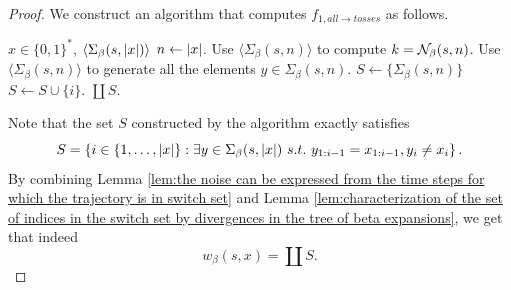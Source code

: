 \begin{proof}
    We construct an algorithm that computes $f_{1,all \to tosses}$ as follows.
    \begin{algorithm}[ht]
        \caption{Algorithm for computing $f_{1,all \to tosses}$}
        \label{alg:algorithm that computes f 1 all noise}
        \begin{algorithmic}[1]
            \Require $x \in \{0,1\}^\ast$, $\langle \Sigma_\beta(s, \left| x \right|) \rangle$
            \State $n \gets \left| x \right|$. \label{line:1:alg:algorithm that computes f 1 all noise}
            \State Use $\langle \Sigma_\beta(s, n) \rangle$ to compute $k = \mathcal{N}_\beta(s,n)$.\label{line:2:alg:algorithm that computes f 1 all noise}
            \State Use $\langle \Sigma_\beta(s, n) \rangle$ to generate all the elements $y \in \Sigma_\beta(s, n)$.\label{line:3:alg:algorithm that computes f 1 all noise}
            \State $S \gets \{\Sigma_\beta(s, n)\}$\label{line:4:alg:algorithm that computes f 1 all noise}
            \label{line:5:alg:algorithm that computes f 1 all noise}
                \label{line:7:alg:algorithm that computes f 1 all noise}
                    \State $S \gets S \cup \{i\}$.\label{line:8:alg:algorithm that computes f 1 all noise}
                \EndIf
            \EndFor
            \State \Return $\coprod S$.\label{line:12:alg:algorithm that computes f 1 all noise}
        \end{algorithmic}
    \end{algorithm}

    \noindent Note that the set $S$ constructed by the algorithm exactly satisfies 
    \begin{equation}
        S = \left\{ i \in \{1,\ldots, \left| x \right|\}: \exists y \in \Sigma_\beta(s,\left| x \right|) \ s.t. \ y_{1:i-1} = x_{1:i-1}, y_i \neq x_i \right\}.
    \end{equation}
    By combining Lemma \ref{lem:the noise can be expressed from the time steps for which the trajectory is in switch set} and Lemma \ref{lem:characterization of the set of indices in the switch set by divergences in the tree of beta expansions}, we get that indeed
    \begin{equation}
        w_\beta(s,x) = \coprod S.
    \end{equation}
\end{proof}

